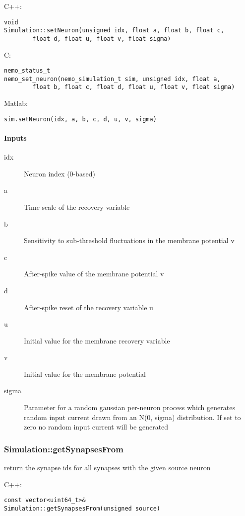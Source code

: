 \noindent C++:
\begin{lstlisting}[aboveskip=2pt]
void
Simulation::setNeuron(unsigned idx, float a, float b, float c, 
        float d, float u, float v, float sigma)
\end{lstlisting}

\noindent C:
\begin{lstlisting}[aboveskip=2pt]
nemo_status_t
nemo_set_neuron(nemo_simulation_t sim, unsigned idx, float a, 
        float b, float c, float d, float u, float v, float sigma)
\end{lstlisting}

\noindent Matlab:
\begin{lstlisting}[aboveskip=2pt]
sim.setNeuron(idx, a, b, c, d, u, v, sigma)
\end{lstlisting}
\paragraph{Inputs}
\begin{description}
\item[idx] Neuron index (0-based)
\item[a] Time scale of the recovery variable
\item[b] Sensitivity to sub-threshold fluctuations in the membrane potential v
\item[c] After-spike value of the membrane potential v
\item[d] After-spike reset of the recovery variable u
\item[u] Initial value for the membrane recovery variable
\item[v] Initial value for the membrane potential
\item[sigma] Parameter for a random gaussian per-neuron process which generates random input current drawn from an N(0, sigma) distribution. If set to zero no random input current will be generated
\end{description}

\clearpage
\subsubsection*{Simulation::getSynapsesFrom}
\label{fn: getSynapsesFrom}
return the synapse ids for all synapses with the given source neuron


\noindent C++:
\begin{lstlisting}[aboveskip=2pt]
const vector<uint64_t>&
Simulation::getSynapsesFrom(unsigned source)
\end{lstlisting}

